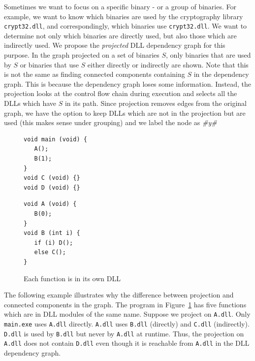 Sometimes we want to focus on a specific binary - or a group of binaries.
For example, we want to know which binaries are used by the cryptography
library {\tt crypt32.dll}, and correspondingly,
which binaries use {\tt crypt32.dll}.
We want to determine not only which binaries are directly used,
but also those which are indirectly used.
We propose the {\em projected} DLL dependency graph for this purpose.
In the graph projected on a set of binaries $S$,
only binaries that are used by $S$ or binaries that use $S$ either directly
or indirectly are shown.
Note that this is not the same as finding connected components containing
$S$ in the dependency graph.
This is because the dependency graph loses some information.
Instead, the projection looks at the control flow chain during
execution and selects all the DLLs which have $S$ in its path.
Since projection removes edges from the original graph, we have the
option to keep DLLs which are not in the projection but are used
(this makes sense under grouping) and we label the node as {\it \#y\#}

\begin{figure}
\centering
\begin{minipage}[t]{3.5cm}
\begin{verbatim}
void main (void) {
   A();
   B(1);
}
void C (void) {}
void D (void) {}
\end{verbatim}
\end{minipage}
\hspace{2.0cm}
\begin{minipage}[t]{3.0cm}
\begin{verbatim}
void A (void) {
   B(0);
}
void B (int i) {
   if (i) D();
   else C();
}
\end{verbatim}
\end{minipage}
\caption{Each function is in its own DLL}
\label{fig:indcalls}
\end{figure}

The following example illustrates why the difference between
projection and connected components in the graph.
The program in Figure~\ref{fig:indcalls} has
five functions which are in DLL modules of the same name.
Suppose we project on {\tt A.dll}.
Only {\tt main.exe} uses {\tt A.dll} directly.
{\tt A.dll} uses {\tt B.dll} (directly) and
{\tt C.dll} (indirectly).
{\tt D.dll} is used by {\tt B.dll} but never by {\tt A.dll} at runtime.
Thus, the projection on {\tt A.dll} does not contain {\tt D.dll} even though
it is reachable from {\tt A.dll} in the DLL dependency graph.

